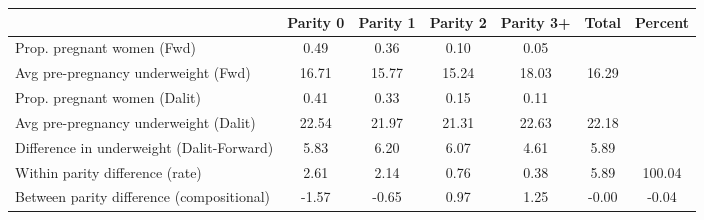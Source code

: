 \begin{tabular}{l*{6}{c}}
\toprule
            &\multicolumn{1}{c}{Parity 0}&\multicolumn{1}{c}{Parity 1}&\multicolumn{1}{c}{Parity 2}&\multicolumn{1}{c}{Parity 3+}&\multicolumn{1}{c}{Total}&\multicolumn{1}{c}{Percent}\\
\midrule
\midrule
Prop. pregnant women (Fwd)&        0.49&        0.36&        0.10&        0.05&            &            \\
Avg pre-pregnancy underweight (Fwd)&       16.71&       15.77&       15.24&       18.03&       16.29&            \\
Prop. pregnant women (Dalit)&        0.41&        0.33&        0.15&        0.11&            &            \\
Avg pre-pregnancy underweight (Dalit)&       22.54&       21.97&       21.31&       22.63&       22.18&            \\
Difference in underweight (Dalit-Forward)&        5.83&        6.20&        6.07&        4.61&        5.89&            \\
Within parity difference (rate)&        2.61&        2.14&        0.76&        0.38&        5.89&      100.04\\
Between parity difference (compositional)&       -1.57&       -0.65&        0.97&        1.25&       -0.00&       -0.04\\
\bottomrule
\end{tabular}
